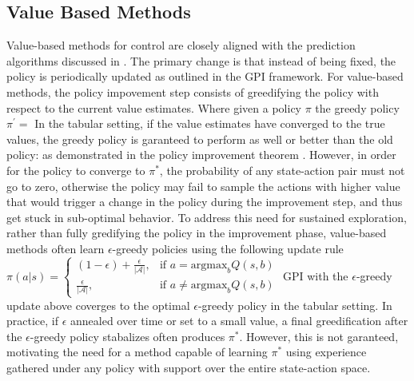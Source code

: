 \subsection{Value Based Methods}
Value-based methods for control are closely aligned with the prediction algorithms discussed in . The primary change is that instead of being fixed, the policy is periodically updated as outlined in the GPI framework. For value-based methods, the policy impovement step consists of greedifying the policy with respect to the current value estimates. Where given a policy $\pi$ the greedy policy $\pi^'=$ %
In the tabular setting, if the value estimates have converged to the true values, the greedy policy is garanteed to perform as well or better than the old policy: %
as demonstrated in the policy improvement theorem .  %
However, in order for the policy to converge to $\pi^*$, the probability of any state-action pair must not go to zero, otherwise the policy may fail to sample the actions with higher value that would trigger a change in the policy during the improvement step, and thus get stuck in sub-optimal behavior. %
To address this need for sustained exploration, rather than fully gredifying the policy in the improvement phase, value-based methods often learn $\epsilon$-greedy policies using the following update rule
$\pi(a|s) = \begin{cases} 
(1 - \epsilon) + \frac{\epsilon}{|\mathcal{A}|}, & \text{if } a = \text{argmax}_{b} Q(s,b) \\ 
\frac{\epsilon}{|\mathcal{A}|}, & \text{if } a \neq \text{argmax}_{b} Q(s,b) 
\end{cases}$
GPI with the $\epsilon$-greedy update above coverges to the optimal $\epsilon$-greedy policy in the tabular setting. In practice, if $\epsilon$ annealed over time or set to a small value, a final greedification after the $\epsilon$-greedy policy stabalizes often produces $\pi^*$. However, this is not garanteed, motivating the need for a method capable of learning $\pi^*$ using experience gathered under any policy with support over the entire state-action space. %


